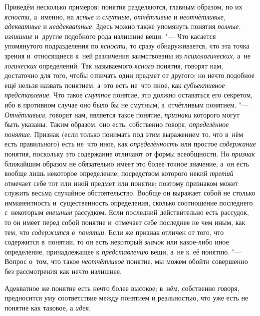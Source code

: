 Приведём несколько примеров: понятия разделяются, главным образом, по их
{\em ясности,} а~именно, на {\em ясные} и {\em смутные, отчётливые} и
{\em неотчётливые, адекватные} и {\em неадекватные}. Здесь можно также
упомянуть понятия {\em полные, излишние} и~другие подобного рода излишние
вещи. "--- Что касается упомянутого подразделения по {\em ясности,} то сразу
обнаруживается, что эта точка зрения и~относящиеся к~ней различения
заимствованы из {\em психологических,} а~не {\em логических} определений. Так
называемого {\em ясного} понятия, говорят нам, достаточно для того, чтобы
отличать один предмет от другого; но нечто подобное ещё нельзя назвать
понятием, а~это есть не~что иное, как {\em субъективное представление}. Что
такое {\em смутное} понятие, это должно оставаться его секретом, ибо в
противном случае оно было бы не смутным, а~отчётливым понятием. "---
{\em Отчётливым,} говорят нам, является такое понятие, {\em признаки} которого
могут быть указаны. Таким образом, оно есть, собственно говоря,
{\em определённое понятие}. Признак (если только понимать под этим выражением
то, что в~нём есть правильного) есть не~что иное, как {\em определённость} или
простое {\em содержание} понятия, поскольку это содержание отличают от формы
всеобщности. Но {\em признак} ближайшим образом не обязательно имеет это более
точное значение, а~он есть вообще лишь некоторое определение, посредством
которого некий {\em третий} отмечает себе тот или иной предмет или понятие;
поэтому признаком может служить весьма случайное обстоятельство. Вообще он
выражает собой не столько имманентность и~существенность определения, сколько
соотношение последнего с~некоторым {\em внешним} рассудком. Если последний
действительно есть рассудок, то он имеет перед собой понятие и~отмечает себе
последнее не чем иным, как тем, что {\em содержится в~понятии}. Если же
признак отличен от того, что содержится в~понятии, то он
есть некоторый {\em значок} или какое-либо иное определение,
принадлежащее к {\em представлению} вещи, а~не к~её понятию. "--- Вопрос
о~том, что такое {\em неотчётливое} понятие, мы можем обойти совершенно
без рассмотрения как нечто излишнее.

Адекватное же понятие есть нечто более высокое; в~нём,
собственно говоря, предносится уму соответствие между понятием и
реальностью, что уже есть не понятие как таковое, а {\em идея}.

